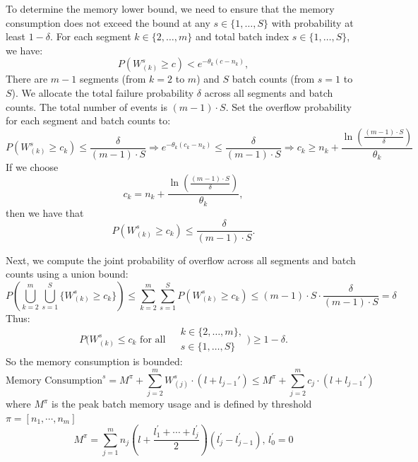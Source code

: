 To determine the memory lower bound, we need to ensure that the memory consumption does not exceed the bound at any \( s \in \{1, \dots, S\} \) with probability at least \( 1 - \delta \). For each segment \( k \in \{2, \dots, m\} \) and total batch index \( s \in \{1, \dots, S\} \), we have:
\[ P\left( W^s_{(k)} \geq c \right) < e^{-\theta_k (c - n_k)}, \]
There are \( m - 1 \) segments (from \( k = 2 \) to \( m \)) and \( S  \) batch counts (from \( s = 1 \) to \( S \)). We allocate the total failure probability \( \delta \) across all segments and batch counts. The total number of events is \( (m - 1) \cdot S \). Set the overflow probability for each segment and batch counts to:
$$P\left( W^s_{(k)} \geq c_k \right) \leq \frac{\delta}{(m - 1) \cdot S}\Rightarrow e^{-\theta_k (c_k - n_k)} \leq \frac{\delta}{(m - 1) \cdot S}\Rightarrow c_k \geq n_k + \frac{\ln\left( \frac{(m - 1) \cdot S}{\delta} \right)}{\theta_k}$$
If we choose 
\[ c_k = n_k + \frac{\ln\left( \frac{(m - 1) \cdot S}{\delta} \right)}{\theta_k}, \]
then we have that
\[ P\left( W^s_{(k)} \geq c_k \right) \leq \frac{\delta}{(m - 1) \cdot S}. \]

Next, we compute the joint probability of overflow across all segments and batch counts using a union bound:
$$P\left( \bigcup_{k=2}^m \bigcup_{s=1}^S \{ W^s_{(k)} \geq c_k \} \right) \leq \sum_{k=2}^m \sum_{s=1}^S P\left( W^s_{(k)} \geq c_k \right)\leq (m - 1) \cdot S \cdot \frac{\delta}{(m - 1) \cdot S} = \delta$$
Thus:
$$P\bigg( W^s_{(k)} \leq c_k \text{ for all } 
\begin{aligned}
    &k \in \{2, \dots, m\}, \\
    &s \in \{1, \dots, S\} 
\end{aligned} \bigg) 
\geq 1 - \delta.$$
So the memory consumption is bounded:
$$    \text{Memory Consumption}^s 
= M^{\pi} + \sum_{j=2}^m W^s_{(j)} \cdot (l + l_{j-1}')\leq M^{\pi} + \sum_{j=2}^m c_j \cdot (l + l_{j-1}')$$
where $M^\pi$ is the peak batch
memory usage and is defined by threshold $\pi=[n_1,\cdots,n_m]$
$$M^\pi = \sum_{j=1}^m n_j \left( l + \frac{l_1^\prime + \cdots +l_{j}^\prime}{2} \right)\left( l_j^\prime - l_{j-1}^\prime \right), \, l_0^\prime =0$$

